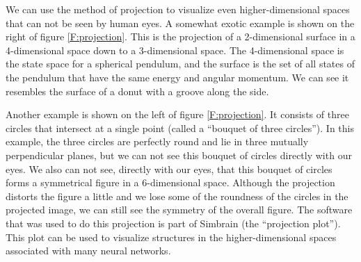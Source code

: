 
   We can use the method of projection to visualize even higher-dimensional 
spaces that can not be seen by human eyes. A somewhat exotic example is shown 
on the right of figure \ref{F:projection}. This is the projection of a 2-dimensional surface in a 4-dimensional space down to a 3-dimensional space. 
The 4-dimensional space is the state space for a spherical pendulum, and the 
surface is the set of all states of the pendulum that have the same energy and 
angular momentum. We can see it resembles the surface of a donut with a groove
along the side. 

   Another example is shown on the left of figure \ref{F:projection}. It 
consists of three circles that intersect at a single point (called a ``bouquet 
of three circles''). In this example, the three circles are perfectly round and 
lie in three mutually perpendicular planes, but we can not see this bouquet of 
circles directly with our eyes. We also can not see, directly with our eyes, 
that this bouquet of circles forms a symmetrical figure in a 6-dimensional 
space. Although the projection distorts the figure a little and we lose some 
of the roundness of the circles in the projected image, we can still see the 
symmetry of the overall figure. The software that was used to do this 
projection is part of Simbrain (the ``projection plot''). This plot can be 
used to visualize structures in the higher-dimensional spaces associated with 
many neural networks.

